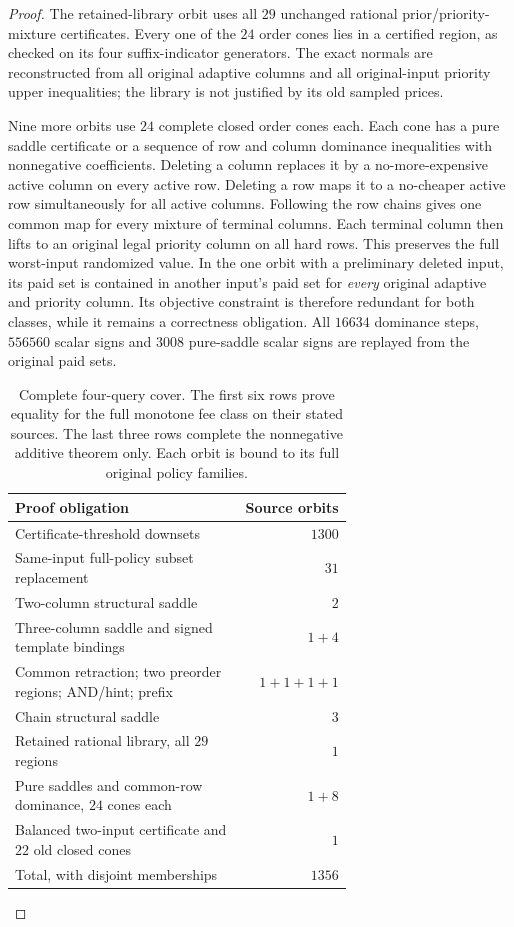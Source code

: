 \begin{proof}
The retained-library orbit uses all $29$ unchanged rational
prior/priority-mixture certificates. Every one of the $24$ order cones
lies in a certified region, as checked on its four suffix-indicator
generators. The exact normals are reconstructed from all original
adaptive columns and all original-input priority upper inequalities;
the library is not justified by its old sampled prices.

Nine more orbits use $24$ complete closed order cones each. Each cone
has a pure saddle certificate or a sequence of row and column
dominance inequalities with nonnegative coefficients. Deleting a
column replaces it by a no-more-expensive active column on every
active row. Deleting a row maps it to a no-cheaper active row
simultaneously for all active columns. Following the row chains gives
one common map for every mixture of terminal columns. Each terminal
column then lifts to an original legal priority column on all hard
rows. This preserves the full worst-input randomized value. In the
one orbit with a preliminary deleted input, its paid set is contained
in another input's paid set for \emph{every} original adaptive and
priority column. Its objective constraint is therefore redundant for
both classes, while it remains a correctness obligation. All $16634$
dominance steps, $556560$ scalar signs and $3008$ pure-saddle scalar
signs are replayed from the original paid sets.

\begin{table}[ht]
\centering\small
\begin{tabular}{@{}p{0.67\linewidth}r@{}}\toprule
Proof obligation & Source orbits\\\midrule
Certificate-threshold downsets & $1300$\\
Same-input full-policy subset replacement & $31$\\
Two-column structural saddle & $2$\\
Three-column saddle and signed template bindings & $1+4$\\
Common retraction; two preorder regions; AND/hint; prefix & $1+1+1+1$\\
Chain structural saddle & $3$\\
Retained rational library, all $29$ regions & $1$\\
Pure saddles and common-row dominance, $24$ cones each & $1+8$\\
Balanced two-input certificate and $22$ old closed cones & $1$\\\midrule
Total, with disjoint memberships & $1356$\\\bottomrule
\end{tabular}
\caption{Complete four-query cover. The first six rows prove equality
for the full monotone fee class on their stated sources. The last
three rows complete the nonnegative additive theorem only. Each orbit
is bound to its full original policy families.}
\label{tab:four-proof-cover}
\end{table}


\end{proof}
